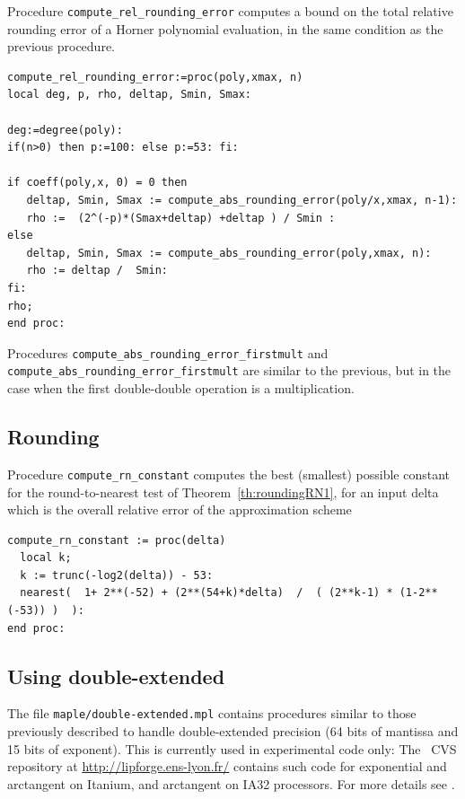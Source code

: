 Procedure \texttt{compute\_rel\_rounding\_error} computes a bound on
the total relative rounding error of a Horner polynomial evaluation,
in the same condition as the previous procedure.

\begin{lstlisting}[caption={compute\_abs\_rounding\_error},firstnumber=1]
compute_rel_rounding_error:=proc(poly,xmax, n)
local deg, p, rho, deltap, Smin, Smax:

deg:=degree(poly):
if(n>0) then p:=100: else p:=53: fi: 

if coeff(poly,x, 0) = 0 then
   deltap, Smin, Smax := compute_abs_rounding_error(poly/x,xmax, n-1):
   rho :=  (2^(-p)*(Smax+deltap) +deltap ) / Smin :
else
   deltap, Smin, Smax := compute_abs_rounding_error(poly,xmax, n):
   rho := deltap /  Smin:
fi:
rho;
end proc:
\end{lstlisting}
\vspace{0.5cm}

Procedures \texttt{compute\_abs\_rounding\_error\_firstmult} and
\texttt{compute\_abs\_rounding\_error\_firstmult} are similar to the
previous, but in the case when the first double-double operation is a
multiplication.



\subsection{Rounding}

Procedure \texttt{compute\_rn\_constant} computes the best (smallest)
possible constant for the round-to-nearest test of
Theorem~\ref{th:roundingRN1}, for an input delta which is the overall
relative error of the approximation scheme

\begin{lstlisting}[caption={compute\_rn\_constant},firstnumber=1]
compute_rn_constant := proc(delta)
  local k;
  k := trunc(-log2(delta)) - 53: 
  nearest(  1+ 2**(-52) + (2**(54+k)*delta)  /  ( (2**k-1) * (1-2**(-53)) )  ):
end proc:
\end{lstlisting}
\vspace{0.5cm}



\subsection{Using double-extended}

The file \texttt{maple/double-extended.mpl} contains procedures
similar to those previously described to handle double-extended
precision (64 bits of mantissa and 15 bits of exponent). This is
currently used in experimental code only: The \crlibm\ CVS repository
at \url{http://lipforge.ens-lyon.fr/} contains such code for
exponential and arctangent on Itanium, and arctangent on IA32
processors. For more details see \cite{DinDefLau2004LIP,DinGast2005}.





